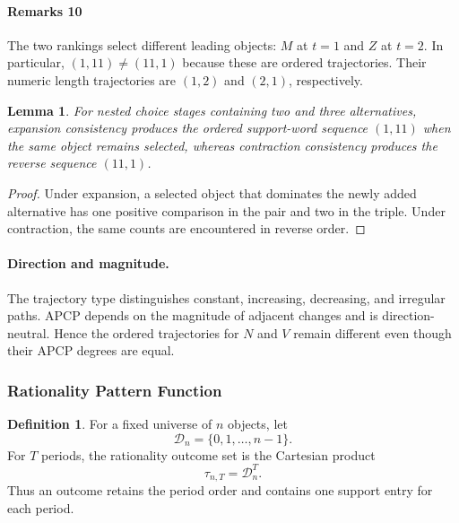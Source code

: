\documentclass[conference]{IEEEtran}
\theoremstyle{plain}
\newtheorem{lemma}{Lemma}
\theoremstyle{definition}
\newtheorem{definition}{Definition}
\theoremstyle{remark}
\begin{document}
	\paragraph{Remarks 10} The two rankings select different leading objects: $M$ at $t=1$ and $Z$ at $t=2$. In particular, $(1,11)\neq(11,1)$ because these are ordered trajectories. Their numeric length trajectories are $(1,2)$ and $(2,1)$, respectively.
	\begin{lemma}\label{lem:strong-weak-patterns}
		For nested choice stages containing two and three alternatives, expansion consistency produces the ordered support-word sequence $(1,11)$ when the same object remains selected, whereas contraction consistency produces the reverse sequence $(11,1)$.
	\end{lemma}
	\begin{proof}
		Under expansion, a selected object that dominates the newly added alternative has one positive comparison in the pair and two in the triple. Under contraction, the same counts are encountered in reverse order.
	\end{proof}
	\paragraph{Direction and magnitude.} The trajectory type distinguishes constant, increasing, decreasing, and irregular paths. APCP depends on the magnitude of adjacent changes and is direction-neutral. Hence the ordered trajectories for $N$ and $V$ remain different even though their APCP degrees are equal.
	\subsubsection{Rationality Pattern Function}
	\begin{definition}
		For a fixed universe of $n$ objects, let
		\begin{equation}
			\mathcal D_n=\{0,1,\ldots,n-1\}.
		\end{equation}
		For $T$ periods, the rationality outcome set is the Cartesian product
		\begin{equation}
			\tau_{n,T}=\mathcal D_n^T.
		\end{equation}
		Thus an outcome retains the period order and contains one support entry for each period.
	\end{definition}
\end{document}
